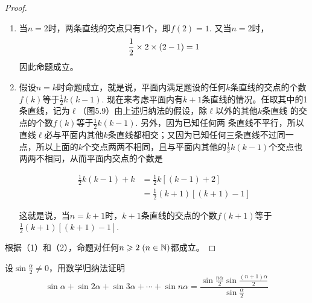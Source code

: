\begin{proof}
\begin{enumerate}[(1)]
    \item 当$n=2$时，两条直线的交点只有1个，即$f(2)=1$. 又当$n=2$时，
\[\dfrac{1}{2}\times2\times(2-1)=1\]
因此命题成立。

\item 假设$n=k$时命题成立，就是说，平面内满足题设的任何$k$条直线的交点的个数$f(k)$等于$\frac{1}{2}k(k-1)$. 现在来考虑平面内有$k+1$条直线的情况。任取其中的1条直线，记为$\ell$（图5.9）由上述归纳法的假设，除$\ell$以外的其他$k$条直线
的交点的个数$f(k)$等于$\frac{1}{2}k(k-1)$. 另外，因为已知任何两
条直线不平行，所以直线$\ell$必与平面内其他$k$条直线都相交；又因为已知任何三条直线不过同一点，所以上面的$k$个交点两两不相同，且与平面内其他的$\frac{1}{2}k(k-1)$个交点也两两不相同，从而平面内交点的个数是

\noindent
\begin{minipage}{.47\textwidth}\CTEXindent
\[\begin{split}
    \frac{1}{2}k(k-1)+k&=\frac{1}{2}k[(k-1)+2]\\
    &=\frac{1}{2}(k+1)[(k+1)-1]
\end{split}\]

这就是说，当$n=k+1$时，$k+1$条直线的交点的个数$f(k+1)$等于$\frac{1}{2}(k+1)[(k+1)-1]$.    
\end{minipage}\hfill
\begin{minipage}{.45\textwidth}
\centering
{}
\end{minipage}
\end{enumerate}

根据（1）和（2），命题对任何$n\geqslant 2\; (n\in\mathbb{N})$都成立。
\end{proof}

\begin{example}
设$\sin\frac{\alpha}{2}\ne 0$，用数学归纳法证明
\[\sin\alpha+\sin2\alpha+\sin3\alpha+\cdots+\sin n\alpha=\frac{\sin\frac{n\alpha}{2}\sin\frac{(n+1)\alpha}{2}}{\sin\frac{\alpha}{2}}\]
\end{example}

